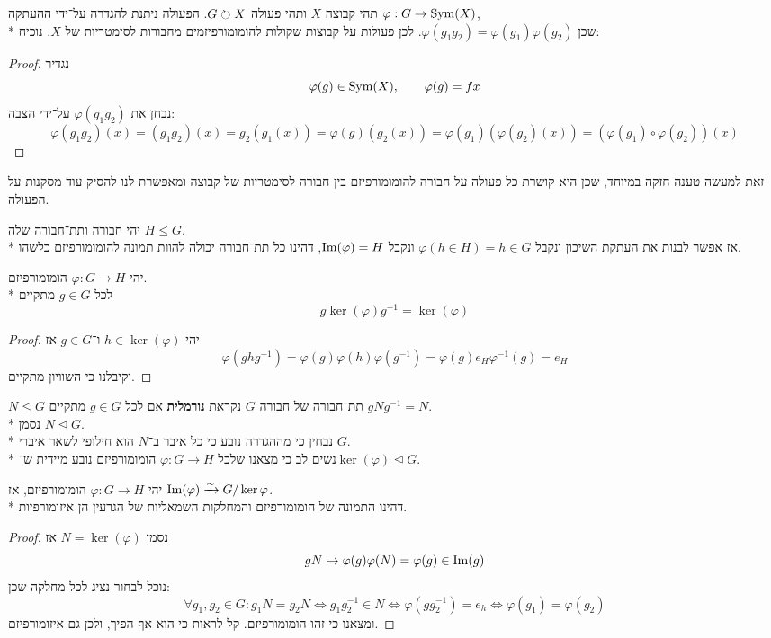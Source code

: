 \begin{example}
	תהי קבוצה $X$ ותהי פעולה $G \circlearrowright X$. הפעולה ניתנת להגדרה על־ידי ההעתקה $\varphi : G \to \operatorname{Sym}(X)$, \\*
	שכן $\varphi(g_1 g_2) = \varphi(g_1) \varphi(g_2)$.
	לכן פעולות על קבוצות שקולות להומומורפיזמים מחבורות לסימטריות של $X$.
	נוכיח:
	\begin{proof}
		נגדיר
		\[
			\varphi(g) \in \operatorname{Sym}(X),
			\qquad
			\varphi(g) = fx
		\]
		נבחן את $\varphi(g_1g_2)$ על־ידי הצבה:
		\[
			\varphi(g_1g_2)(x)
			= (g_1 g_2)(x)
			= g_2(g_1(x))
			= \varphi(g)(g_2(x))
			= \varphi(g_1)(\varphi(g_2)(x))
			= (\varphi(g_1) \circ \varphi(g_2))(x)
		\]
	\end{proof}
	זאת למעשה טענה חזקה במיוחד, שכן היא קושרת כל פעולה על חבורה להומומורפיזם בין חבורה לסימטריות של קבוצה ומאפשרת לנו להסיק עוד מסקנות על הפעולה.
\end{example}
\begin{example}[שיכון]
	יהי חבורה ותת־חבורה שלה $H \le G$. \\*
	אז אפשר לבנות את העתקת השיכון ונקבל $\varphi(h \in H) = h \in G$ ונקבל $\operatorname{Im}(\varphi) = H$, דהינו כל תת־חבורה יכולה להוות תמונה להומומורפיזם כלשהו.
\end{example}
\begin{proposition}
	יהי $\varphi : G \to H$ הומומורפיזם. \\*
	לכל $g \in G$ מתקיים
	\[
		g \ker(\varphi) g^{-1} = \ker(\varphi)
	\]
\end{proposition}
\begin{proof}
	יהי $h \in \ker(\varphi)$ ו־$g \in G$ אז
	\[
		\varphi(g h g^{-1}) = \varphi(g) \varphi(h) \varphi(g^{-1}) = \varphi(g) e_H \varphi^{-1}(g) = e_H
	\]
	וקיבלנו כי השוויון מתקיים.
\end{proof}

\begin{definition}
$N \le G$ תת־חבורה של חבורה $G$ נקראת \textbf{נורמלית} אם לכל $g \in G$ מתקיים $g N g^{-1} = N$. \\*
נסמן $N \trianglelefteq G$. \\*
נבחין כי מההגדרה נובע כי כל איבר ב־$N$ הוא חילופי לשאר איברי $G$. \\*
נשים לב כי מצאנו שלכל $\varphi : G \to H$ הומומורפיזם נובע מיידית ש־$\ker(\varphi) \trianglelefteq G$.
\end{definition}

\begin{theorem}
	יהי $\varphi : G \to H$ הומומורפיזם, אז $\operatorname{Im}(\varphi) \xrightarrow{\sim} G/\ker{\varphi}$. \\*
	דהינו התמונה של הומומורפיזם והמחלקות השמאליות של הגרעין הן איזומורפיות.
\end{theorem}
\begin{proof}
	נסמן $N = \ker(\varphi)$ אז
	\[
		g N \mapsto \varphi(g) \varphi(N) = \varphi(g) \in \operatorname{Im}(g)
	\]
	נוכל לבחור נציג לכל מחלקה שכן:
	\[
		\forall g_1, g_2 \in G : g_1 N = g_2 N \iff g_1 g_2^{-1} \in N \iff \varphi(g g_2^{-1}) = e_h \iff \varphi(g_1) = \varphi(g_2)
	\]
	ומצאנו כי זהו הומומורפיזם. קל לראות כי הוא אף הפיך, ולכן גם איזומורפיזם.
\end{proof}

